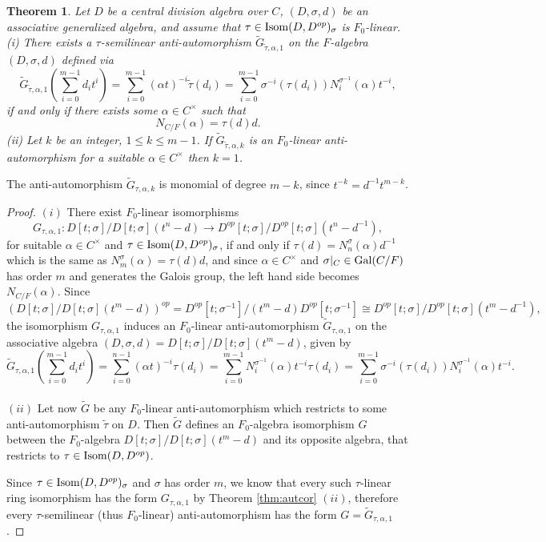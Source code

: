 \documentclass{amsart}
\theoremstyle{plain}
\newtheorem{theorem}{Theorem}[section]
\theoremstyle{definition}
\numberwithin{equation}{section}
\numberwithin{figure}{section}
\begin{document}
\begin{theorem} \label{thm:maingeneralizedantiautcor} 
Let $D$ be a central division algebra over $C$, $ (D, \sigma, d)$ be an associative generalized algebra, and assume that $\tau\in {\rm Isom}(D,D^{op})_\sigma$ is  $F_0$-linear.
\\ (i)
  There exists a $\tau$-semilinear anti-automorphism $\widetilde G_{\tilde\tau,\alpha,1}$ on the $F$-algebra $ (D, \sigma, d)$ defined via
$$\widetilde G_{\tilde\tau,\alpha,1}(\sum_{i=0}^{m-1}d_it^i)=\sum_{i=0}^{m-1} (\alpha t)^{-i} \tilde \tau(d_i)= \sum_{i=0}^{m-1} \sigma^{-i}(\tau(d_i)) N_i^{\sigma^{-1}}(\alpha) t^{-i},$$
 if and only if  there exists  some $\alpha\in C^\times$ such that
$$N_{C/F}(\alpha)= \tau(d)d.$$
(ii) Let  $k$ be an integer, $1\leq k\leq m-1$. If $\widetilde G_{\tilde \tau,\alpha,k}$ is an $F_0$-linear anti-automorphism  for a suitable $\alpha\in C^\times$ then $k=1$.
\end{theorem}

The anti-automorphism $\widetilde G_{\tau,\alpha,k}$ is monomial of degree $m-k$, since $t^{-k}=d^{-1}t^{m-k}$.

\begin{proof}
$(i)$
There exist  $F_0$-linear isomorphisms
 $$ G_{\tau,\alpha,1}: D[t;\sigma]/D[t;\sigma](t^n-d)\to D^{op}[t;\sigma]/D^{op}[t;\sigma](t^n-d^{-1}),$$
    for suitable $\alpha\in C^\times$ and $\tau \in {\rm Isom}(D,D^{op})_\sigma$, if and only if $\tau(d) = N^\sigma_{n}(\alpha) d^{-1}$
which is the same as
   $N^\sigma_{m}(\alpha)= \tau(d)d$, and since $\alpha\in C^\times$ and $\sigma|_C\in {\rm Gal}(C/F)$ has order $m$ and generates the Galois group, the left hand side becomes  $N_{C/F}(\alpha)$.
   Since
$$(D[t;\sigma]/D[t;\sigma](t^m-d))^{op}=D^{op}[t;\sigma^{-1}]/ (t^m-d) D^{op}[t;\sigma^{-1}] \cong D^{op}[t;\sigma]/D^{op}[t;\sigma](t^m-d^{-1}),$$
 the isomorphism $G_{\tau,\alpha,1}$ induces an  $F_0$-linear anti-automorphism $\widetilde G_{\tau,\alpha,1}$ on the associative algebra $ (D, \sigma, d)=D[t;\sigma]/D[t;\sigma](t^m-d)$, given by
$$
\widetilde G_{\tau,\alpha,1}(\sum_{i=0}^{m-1}d_it^i)=\sum_{i=0}^{n-1}(\alpha t)^{-i}\tau(d_i) = \sum_{i=0}^{m-1} N_i^{\sigma^{-1}}(\alpha) t^{-i} \tau(d_i)
= \sum_{i=0}^{m-1} \sigma^{-i}(\tau(d_i)) N_i^{\sigma^{-1}}(\alpha) t^{-i} .$$
\\ $(ii)$ Let now $\widetilde G$ be any $F_0$-linear anti-automorphism which restricts to some  anti-automorphism  $\tilde \tau$ on $D$. Then $\widetilde  G$ defines an $F_0$-algebra isomorphism $G$ between the $F_0$-algebra $D[t;\sigma]/D[t;\sigma](t^m-d)$ and its opposite algebra, that restricts to $\tau\in {\rm Isom}(D,D^{op})$.

Since $\tau\in {\rm Isom}(D,D^{op})_\sigma$ and  $\sigma$ has order $m$, we know that
every such $\tau$-linear  ring isomorphism has the form $ G_{\tau,\alpha,1}$ by Theorem \ref{thm:autcor} $(ii)$, therefore every $\tau$-semilinear (thus $F_0$-linear) anti-automorphism  has the form $G=\widetilde G_{\tau,\alpha,1}$.
\end{proof}
\end{document}
